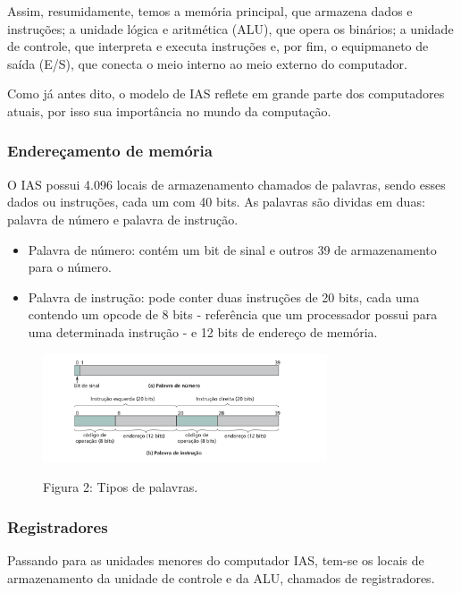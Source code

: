 \documentclass{article}
\begin{document}
Assim, resumidamente, temos a memória principal, que armazena dados e
instruções; a unidade lógica e aritmética (ALU), que opera os binários; a
unidade de controle, que interpreta e executa instruções e, por fim, o
equipmaneto de saída (E/S), que conecta o meio interno ao meio externo do
computador.

Como já antes dito, o modelo de IAS reflete em grande parte dos computadores
atuais, por isso sua importância no mundo da computação.

\subsubsection{Endereçamento de memória}
O IAS possui 4.096 locais de armazenamento chamados de palavras, sendo esses
dados ou instruções, cada um com 40 bits. As palavras são dividas em duas:
palavra de número e palavra de instrução.

\begin{itemize}
        \item Palavra de número: contém um bit de sinal e outros 39 de
            armazenamento para o número. 
        \item Palavra de instrução: pode conter duas instruções de 20 bits,
            cada uma contendo um opcode de 8 bits - referência que um
            processador possui para uma determinada instrução - e 12 bits de
            endereço de memória.
\end{itemize}

\begin{figure}[h]
   \caption{Figura 2: Tipos de palavras.}\textbf{}
   \centering
  \includegraphics[width=0.75\textwidth]{palavras.png}
\end{figure}

\subsubsection{Registradores}
Passando para as unidades menores do computador IAS, tem-se os locais de
armazenamento da unidade de controle e da ALU, chamados de registradores.
\end{document}
